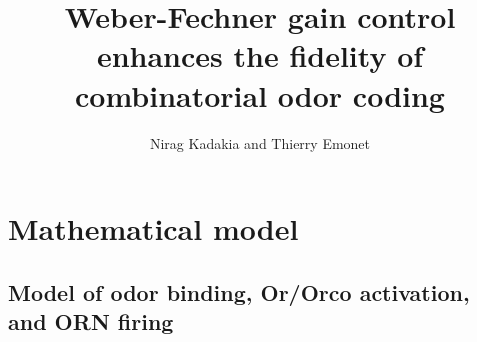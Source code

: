 \documentclass[9pt,twoside,lineno]{pnas-new}
\title{Weber-Fechner gain control enhances the fidelity of combinatorial odor coding}
\author{Nirag Kadakia and Thierry Emonet}
\begin{document}

\maketitle

\SItext

\section*{Mathematical model}

\subsection*{Model of odor binding, Or/Orco activation, and ORN firing}
\end{document}
